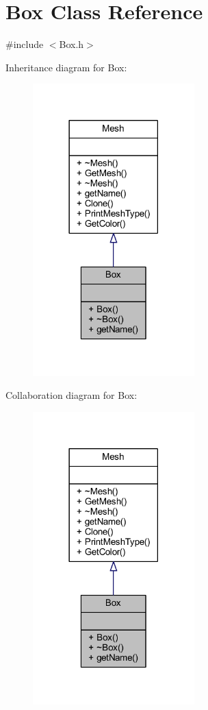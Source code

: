 \hypertarget{class_box}{}\section{Box Class Reference}
\label{class_box}


{\ttfamily \#include $<$Box.\+h$>$}



Inheritance diagram for Box\+:
\nopagebreak
\begin{figure}[H]
\begin{center}
\leavevmode
\includegraphics[width=177pt]{class_box__inherit__graph}
\end{center}
\end{figure}


Collaboration diagram for Box\+:
\nopagebreak
\begin{figure}[H]
\begin{center}
\leavevmode
\includegraphics[width=177pt]{class_box__coll__graph}
\end{center}
\end{figure}
